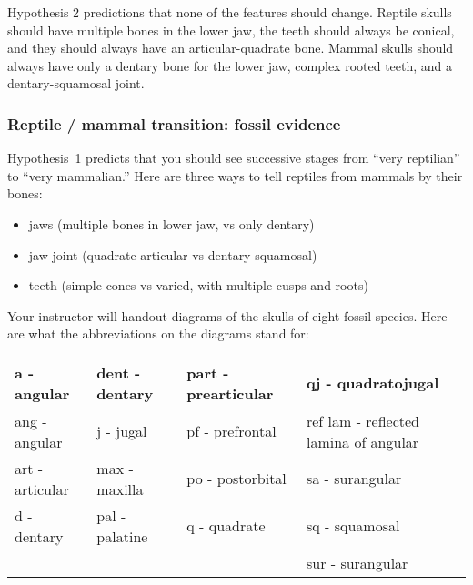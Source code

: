 \documentclass[12pt, hidelinks]{exam}
\newcommand*\AnswerBox[2]{%
    \parbox[t][#1]{0.92\textwidth}{%
    \begin{solution}#2\end{solution}}
    \vspace{\stretch{1}}
}
\begin{document}
\begin{questions}
\AnswerBox{6\baselineskip}{%
Hypothesis 2 predictions that none of the features should change. Reptile skulls should have multiple bones in the lower jaw, the teeth should always be conical, and they should always have an articular-quadrate bone. Mammal skulls should always have only a dentary bone for the lower jaw, complex rooted teeth, and a dentary-squamosal joint.}

\newpage

\subsubsection*{Reptile / mammal transition: fossil evidence}

Hypothesis~1 predicts that you should see successive stages from ``very reptilian'' to
``very mammalian.'' Here are three ways to tell reptiles from mammals by their bones:



\begin{itemize}
\item
  jaws (multiple bones in lower jaw, vs only dentary)
\item
  jaw joint (quadrate-articular vs dentary-squamosal)
\item
  teeth (simple cones vs varied, with multiple cusps and roots)
\end{itemize}

Your instructor will handout diagrams of the skulls of eight fossil species.
Here are what the abbreviations on the diagrams stand for:

\begin{longtable}[c]{@{}L{0.22\textwidth}L{0.22\textwidth}L{0.22\textwidth}L{0.22\textwidth}@{}}
\toprule
a - angular & dent - dentary & part - prearticular & qj -
quadratojugal\tabularnewline
\midrule
\endhead
ang - angular & j - jugal & pf - prefrontal & ref lam - reflected lamina
of angular\tabularnewline
art - articular & max - maxilla & po - postorbital & sa -
surangular\tabularnewline
d - dentary & pal - palatine & q - quadrate & sq -
squamosal\tabularnewline
& & & sur - surangular\tabularnewline
\bottomrule
\end{longtable}


\end{questions}
\end{document}
